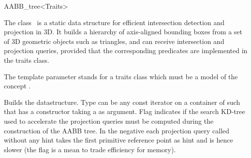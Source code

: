 \ccRefPageBegin


\begin{ccRefClass}{AABB_tree<Traits>}  %


\ccDefinition
  
The class \ccRefName\ is a static data structure for efficient intersection detection and projection in 3D. It builds a hierarchy of axis-aligned bounding boxes from a set of 3D geometric objects such as triangles, and can receive intersection and projection queries, provided that the corresponding predicates are implemented in the traits class. 

The template parameter  stands for a traits class which must be a model of the concept .


\ccTypes

\ccGlue
{}
\ccGlue
{}
\ccGlue
{}
\ccGlue


\ccCreation
{}  %

{Builds the datastructure. Type  can be any const iterator on a container of  such that  has a constructor taking a  as argument. Flag  indicates if the search KD-tree used to accelerate the projection queries must be computed during the construction of the AABB tree. In the negative each projection query called without any hint takes the first primitive reference point as hint and is hence slower (the flag is a mean to trade efficiency for memory). }


\end{ccRefClass}
